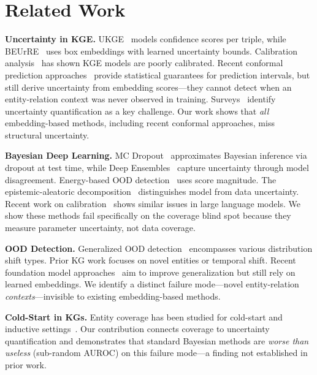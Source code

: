 \documentclass{article}
\begin{document}
\section{Related Work}

\textbf{Uncertainty in KGE.} UKGE~\citep{chen2019ukge} models confidence scores per triple, while BEUrRE~\citep{chen2021beurre} uses box embeddings with learned uncertainty bounds. Calibration analysis~\citep{safavi2020evaluating,zhu2024reliablekg} has shown KGE models are poorly calibrated. Recent conformal prediction approaches~\citep{zhu2025certainty,zhu2025predicate} provide statistical guarantees for prediction intervals, but still derive uncertainty from embedding scores---they cannot detect when an entity-relation context was never observed in training. Surveys~\citep{munikoti2024challenges} identify uncertainty quantification as a key challenge. Our work shows that \emph{all} embedding-based methods, including recent conformal approaches, miss structural uncertainty.

\textbf{Bayesian Deep Learning.} MC Dropout~\citep{gal2016dropout} approximates Bayesian inference via dropout at test time, while Deep Ensembles~\citep{lakshminarayanan2017simple} capture uncertainty through model disagreement. Energy-based OOD detection~\citep{liu2020energy} uses score magnitude. The epistemic-aleatoric decomposition~\citep{kendall2017uncertainties} distinguishes model from data uncertainty. Recent work on calibration~\citep{zhang2024calibration} shows similar issues in large language models. We show these methods fail specifically on the coverage blind spot because they measure parameter uncertainty, not data coverage.

\textbf{OOD Detection.} Generalized OOD detection~\citep{yang2021generalized} encompasses various distribution shift types. Prior KG work focuses on novel entities or temporal shift. Recent foundation model approaches~\citep{galkin2024towards} aim to improve generalization but still rely on learned embeddings. We identify a distinct failure mode---novel entity-relation \emph{contexts}---invisible to existing embedding-based methods.

\textbf{Cold-Start in KGs.} Entity coverage has been studied for cold-start and inductive settings~\citep{hamaguchi2017knowledge}. Our contribution connects coverage to uncertainty quantification and demonstrates that standard Bayesian methods are \emph{worse than useless} (sub-random AUROC) on this failure mode---a finding not established in prior work.
\end{document}
